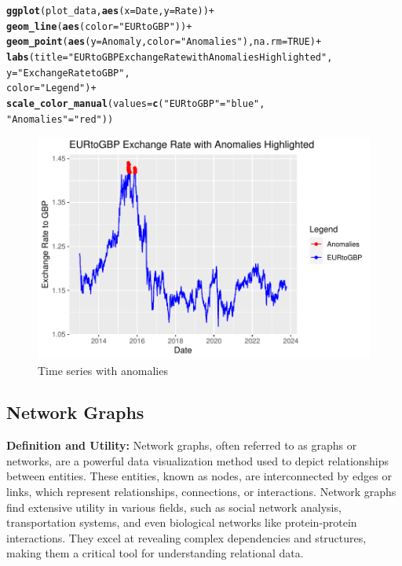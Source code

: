 \documentclass{article}\usepackage[]{graphicx}\usepackage[]{xcolor}
\makeatletter
\def\maxwidth{ %
  \ifdim\Gin@nat@width>\linewidth
    \linewidth
  \else
    \Gin@nat@width
  \fi
}
\newcommand{\hlnum}[1]{\textcolor[rgb]{0.686,0.059,0.569}{#1}}%
\newcommand{\hlstr}[1]{\textcolor[rgb]{0.192,0.494,0.8}{#1}}%
\newcommand{\hlopt}[1]{\textcolor[rgb]{0,0,0}{#1}}%
\newcommand{\hlstd}[1]{\textcolor[rgb]{0.345,0.345,0.345}{#1}}%
\newcommand{\hlkwc}[1]{\textcolor[rgb]{0.333,0.667,0.333}{#1}}%
\newcommand{\hlkwd}[1]{\textcolor[rgb]{0.737,0.353,0.396}{\textbf{#1}}}%
\newenvironment{kframe}{%
 \def\at@end@of@kframe{}%
 \ifinner\ifhmode%
  \def\at@end@of@kframe{\end{minipage}}%
  \begin{minipage}{\columnwidth}%
 \fi\fi%
 \def\FrameCommand##1{\hskip\@totalleftmargin \hskip-\fboxsep
 \colorbox{shadecolor}{##1}\hskip-\fboxsep
     \hskip-\linewidth \hskip-\@totalleftmargin \hskip\columnwidth}%
 \MakeFramed {\advance\hsize-\width
   \@totalleftmargin\z@ \linewidth\hsize
   \@setminipage}}%
 {\par\unskip\endMakeFramed%
 \at@end@of@kframe}
\newenvironment{knitrout}{}{} %
\makeatother
\begin{document}
\begin{knitrout}
\begin{kframe}
\begin{alltt}
\hlkwd{ggplot}\hlstd{(plot_data,} \hlkwd{aes}\hlstd{(}\hlkwc{x} \hlstd{= Date,} \hlkwc{y} \hlstd{= Rate))} \hlopt{+}
  \hlkwd{geom_line}\hlstd{(}\hlkwd{aes}\hlstd{(}\hlkwc{color} \hlstd{=} \hlstr{"EURtoGBP"}\hlstd{))} \hlopt{+}
  \hlkwd{geom_point}\hlstd{(}\hlkwd{aes}\hlstd{(}\hlkwc{y} \hlstd{= Anomaly,} \hlkwc{color} \hlstd{=} \hlstr{"Anomalies"}\hlstd{),} \hlkwc{na.rm} \hlstd{=} \hlnum{TRUE}\hlstd{)} \hlopt{+}
  \hlkwd{labs}\hlstd{(}\hlkwc{title} \hlstd{=} \hlstr{"EURtoGBP Exchange Rate with Anomalies Highlighted"}\hlstd{,}
       \hlkwc{y} \hlstd{=} \hlstr{"Exchange Rate to GBP"}\hlstd{,}
       \hlkwc{color} \hlstd{=} \hlstr{"Legend"}\hlstd{)} \hlopt{+}
  \hlkwd{scale_color_manual}\hlstd{(}\hlkwc{values} \hlstd{=} \hlkwd{c}\hlstd{(}\hlstr{"EURtoGBP"} \hlstd{=} \hlstr{"blue"}\hlstd{,}
                                \hlstr{"Anomalies"} \hlstd{=} \hlstr{"red"}\hlstd{))}
\end{alltt}
\end{kframe}\begin{figure}
\includegraphics[width=\maxwidth]{figure/unnamed-chunk-6-1} \caption[Time series with anomalies]{Time series with anomalies}\label{fig:unnamed-chunk-6}
\end{figure}

\end{knitrout}


\subsection{Network Graphs}
\textbf{Definition and Utility:}
Network graphs, often referred to as graphs or networks, are a powerful data visualization method used to depict relationships between entities. These entities, known as nodes, are interconnected by edges or links, which represent relationships, connections, or interactions. Network graphs find extensive utility in various fields, such as social network analysis, transportation systems, and even biological networks like protein-protein interactions. They excel at revealing complex dependencies and structures, making them a critical tool for understanding relational data.
\end{document}
